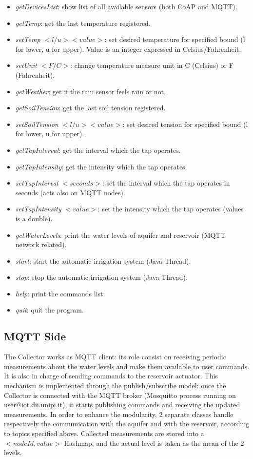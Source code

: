 \begin{itemize}
	\item \textit{getDevicesList}: show list of all available sensors (both CoAP and MQTT).
	\item \textit{getTemp}: get the last temperature registered.
	\item \textit{setTemp $<l/u> <value>$}: set desired temperature for specified bound (l for lower, u for upper). Value is an integer expressed in Celsius/Fahrenheit.
	\item \textit{setUnit $<F/C>$}: change temperature measure unit in C (Celsius) or F (Fahrenheit).
	\item \textit{getWeather}: get if the rain sensor feels rain or not.
	\item \textit{getSoilTension}: get the last soil tension registered.
	\item \textit{setSoilTension $<l/u> <value>$}: set desired tension for specified bound (l for lower, u for upper).
	\item \textit{getTapInterval}: get the interval which the tap operates.
	\item \textit{getTapIntensity}: get the intensity which the tap operates.
	\item \textit{setTapInterval $<seconds>$}: set the interval which the tap operates in seconds (acts also on MQTT nodes).
	\item \textit{setTapIntensity $<value>$}: set the intensity which the tap operates (values is a double).
	\item \textit{getWaterLevels}: print the water levels of aquifer and reservoir (MQTT network related).
	\item \textit{start}: start the automatic irrigation system (Java Thread).
	\item \textit{stop}: stop the automatic irrigation system (Java Thread).
	\item \textit{help}: print the commands list.
	\item \textit{quit}: quit the program.
\end{itemize}




\subsection{MQTT Side}
The Collector works as MQTT client: its role consist on receiving periodic measurements about the water levels and make them available to user commands. It is also in charge of sending commands to the reservoir actuator. This mechanism is implemented through the publish/subscribe model: once the Collector is connected with the MQTT broker (Mosquitto process running on user@iot.dii.unipi.it), it starts publishing commands and receiving the updated measurements.
In order to enhance the modularity, 2 separate classes handle respectively the communication with the aquifer and  with the reservoir, according to topics specified above. Collected measurements are stored into a $<nodeId, value>$ Hashmap, and the actual level is taken as the mean of the 2 levels.


